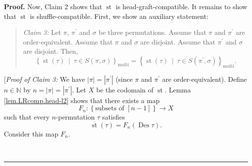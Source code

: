 \documentclass[numbers=enddot,12pt,final,onecolumn,notitlepage]{scrartcl}%
\theoremstyle{definition}
\newenvironment{statement}{\begin{quote}}{\end{quote}}
\newenvironment{proof}[1][Proof]{\noindent\textbf{#1.} }{\ \rule{0.5em}{0.5em}}
\newenvironment{verlong}{}{}
\begin{document}
\begin{verlong}
\begin{proof}
Now, Claim 2 shows that $\operatorname*{st}$ is head-graft-compatible. It
remains to show that $\operatorname*{st}$ is shuffle-compatible. First, we
show an auxiliary statement:

\begin{statement}
\textit{Claim 3:} Let $\pi$, $\pi^{\prime}$ and $\sigma$ be three
permutations. Assume that $\pi$ and $\pi^{\prime}$ are order-equivalent.
Assume that $\pi$ and $\sigma$ are disjoint. Assume that $\pi^{\prime}$ and
$\sigma$ are disjoint. Then,%
\[
\left\{  \operatorname*{st}\left(  \tau\right)  \ \mid\ \tau\in S\left(
\pi,\sigma\right)  \right\}  _{\operatorname*{multi}}=\left\{
\operatorname*{st}\left(  \tau\right)  \ \mid\ \tau\in S\left(  \pi^{\prime
},\sigma\right)  \right\}  _{\operatorname*{multi}}.
\]

\end{statement}

[\textit{Proof of Claim 3:} We have $\left\vert \pi\right\vert =\left\vert
\pi^{\prime}\right\vert $ (since $\pi$ and $\pi^{\prime}$ are
order-equivalent). Define $n\in\mathbb{N}$ by $n=\left\vert \pi\right\vert
=\left\vert \pi^{\prime}\right\vert $. Let $X$ be the codomain of
$\operatorname*{st}$. Lemma \ref{lem.LRcomp.head-l2} shows that there exists a
map
\[
F_{n}:\left\{  \text{subsets of }\left[  n-1\right]  \right\}  \rightarrow X
\]
such that every $n$-permutation $\tau$ satisfies
\begin{equation}
\operatorname*{st}\left(  \tau\right)  =F_{n}\left(  \operatorname*{Des}%
\tau\right)  . \label{pf.lem.LRcomp.head-l2.c3.pf.1}%
\end{equation}
Consider this map $F_{n}$.


\end{proof}
\end{verlong}
\end{document}
